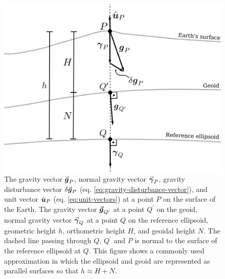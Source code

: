 \documentclass[extra]{gji}
\newcommand{\versor}[1]{\hat{\mitbf{#1}}}
\renewcommand{\vector}[1]{\vec{\mitbf{#1}}}
\begin{document}
\begin{figure}
    \includegraphics{figures/surfaces.png}
    \caption{
    The gravity vector
    $\vector{g}_{P}$, normal gravity vector $\vector{\gamma}_{P}$,
    gravity disturbance vector $\delta \vector{g}_{P}$
    (eq. \ref{eq:gravity-disturbance-vector}), and unit vector
    $\versor{u}_{P}$ (eq. \ref{eq:unit-vectors}) at a point $P$
    on the surface of the Earth.
    The gravity vector $\vector{g}_{Q^{\prime}}$
    at a point $Q^{\prime}$ on the geoid, normal gravity vector
    $\vector{\gamma}_{Q}$ at a point $Q$ on the reference ellipsoid,
    geometric height $h$, orthometric height $H$, and geoidal height $N$.
    The dashed line passing through
    $Q$, $Q^{\prime}$ and $P$ is normal to the
    surface of the reference ellipsoid at $Q$.
    This figure shows a commonly used approximation in which the ellipsoid and
    geoid are represented as parallel surfaces so that $h \approx H + N$.
    }
  \label{fig:surfaces}
\end{figure}

\label{lastpage}
\end{document}
